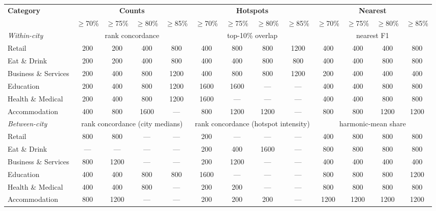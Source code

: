 \begin{tabular}{@{}lcccccccccccc@{}}
\toprule
\textbf{Category} & \multicolumn{4}{c}{\textbf{Counts}} & \multicolumn{4}{c}{\textbf{Hotspots}} & \multicolumn{4}{c}{\textbf{Nearest}} \\
\cmidrule(lr){2-5}
\cmidrule(lr){6-9}
\cmidrule(lr){10-13}
 & $\geq$70\% & $\geq$75\% & $\geq$80\% & $\geq$85\% & $\geq$70\% & $\geq$75\% & $\geq$80\% & $\geq$85\% & $\geq$70\% & $\geq$75\% & $\geq$80\% & $\geq$85\% \\
\midrule
\textit{Within-city} & \multicolumn{4}{c}{\footnotesize rank concordance} & \multicolumn{4}{c}{\footnotesize top-10\% overlap} & \multicolumn{4}{c}{\footnotesize nearest F1} \\
Retail & 200 & 200 & 400 & 800 & 400 & 800 & 800 & 1200 & 400 & 400 & 400 & 800 \\
Eat \& Drink & 200 & 200 & 400 & 800 & 400 & 400 & 800 & 800 & 400 & 400 & 800 & 800 \\
Business \& Services & 200 & 400 & 800 & 1200 & 400 & 800 & 800 & 1200 & 200 & 400 & 400 & 400 \\
Education & 200 & 400 & 800 & 1200 & 1600 & 1600 & --- & --- & 400 & 400 & 800 & 800 \\
Health \& Medical & 200 & 400 & 800 & 1200 & 1600 & --- & --- & --- & 400 & 400 & 800 & 800 \\
Accommodation & 400 & 800 & 1600 & --- & 800 & 1200 & 1200 & --- & 800 & 800 & 1200 & 1200 \\
\midrule
\textit{Between-city} & \multicolumn{4}{c}{\footnotesize rank concordance (city medians)} & \multicolumn{4}{c}{\footnotesize rank concordance (hotspot intensity)} & \multicolumn{4}{c}{\footnotesize harmonic-mean share} \\
Retail & 800 & 800 & --- & --- & 200 & --- & --- & --- & 400 & 800 & 800 & 800 \\
Eat \& Drink & --- & --- & --- & --- & 200 & 400 & 1600 & --- & 800 & 800 & 800 & 800 \\
Business \& Services & 800 & 1200 & --- & --- & 200 & 1200 & --- & --- & 400 & 400 & 400 & 400 \\
Education & 400 & 400 & 800 & 800 & 1600 & --- & --- & --- & 800 & 800 & 800 & 1200 \\
Health \& Medical & 400 & 400 & 800 & --- & 200 & 200 & --- & --- & 800 & 800 & 800 & 800 \\
Accommodation & 800 & 1200 & --- & --- & 200 & 200 & 200 & --- & 1200 & 1200 & 1200 & 1200 \\
\bottomrule
\end{tabular}
